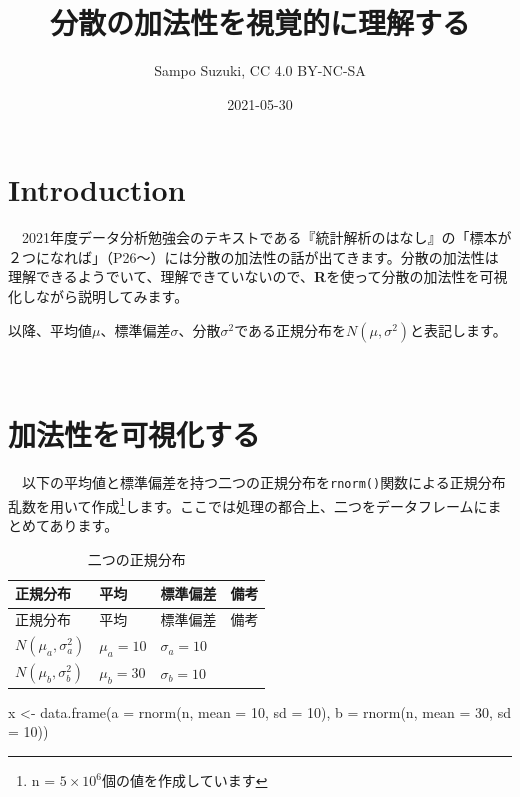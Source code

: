 \documentclass[]{tufte-handout}
\title[分散の加法性を視覚的に理解する]{分散の加法性を視覚的に理解する}
\author{Sampo Suzuki, CC 4.0 BY-NC-SA}
\date{2021-05-30}
\newenvironment{Shaded}{}{}
\newcommand{\AttributeTok}[1]{\textcolor[rgb]{0.49,0.56,0.16}{#1}}
\newcommand{\DecValTok}[1]{\textcolor[rgb]{0.25,0.63,0.44}{#1}}
\newcommand{\FunctionTok}[1]{\textcolor[rgb]{0.02,0.16,0.49}{#1}}
\newcommand{\NormalTok}[1]{#1}
\newcommand{\OtherTok}[1]{\textcolor[rgb]{0.00,0.44,0.13}{#1}}
\begin{document}
\maketitle




\hypertarget{introduction}{%
\section{\texorpdfstring{\textbf{Introduction}}{Introduction}}\label{introduction}}

　2021年度データ分析勉強会のテキストである『統計解析のはなし』\citep{ToukeiKaisekinoHanashi}の「標本が２つになれば」（P26〜）には分散の加法性の話が出てきます。分散の加法性は理解できるようでいて、理解できていないので、\textbf{R}を使って分散の加法性を可視化しながら説明してみます。

以降、平均値\(\mu\)、標準偏差\(\sigma\)、分散\(\sigma^2\)である正規分布を\(N(\mu, \sigma^2)\)と表記します。

　

\hypertarget{ux52a0ux6cd5ux6027ux3092ux53efux8996ux5316ux3059ux308b}{%
\section{\texorpdfstring{\textbf{加法性を可視化する}}{加法性を可視化する}}\label{ux52a0ux6cd5ux6027ux3092ux53efux8996ux5316ux3059ux308b}}

　以下の平均値と標準偏差を持つ二つの正規分布を\texttt{rnorm()}関数による正規分布乱数を用いて作成\footnote{n
  = \ensuremath{5\times 10^{6}}個の値を作成しています}します。ここでは処理の都合上、二つをデータフレームにまとめてあります。

\begin{longtable}[]{@{}llll@{}}
\caption{二つの正規分布}\tabularnewline
\toprule
正規分布 & 平均 & 標準偏差 & 備考 \\
\midrule
\endfirsthead
\toprule
正規分布 & 平均 & 標準偏差 & 備考 \\
\midrule
\endhead
\(N(\mu_a, \sigma^2_a)\) & \(\mu_a = 10\) & \(\sigma_a = 10\) & \\
\(N(\mu_b, \sigma^2_b)\) & \(\mu_b = 30\) & \(\sigma_b = 10\) & \\
\bottomrule
\end{longtable}

\begin{Shaded}
\begin{Highlighting}[numbers=left,,]
\NormalTok{x }\OtherTok{\textless{}{-}} \FunctionTok{data.frame}\NormalTok{(}\AttributeTok{a =} \FunctionTok{rnorm}\NormalTok{(n, }\AttributeTok{mean =} \DecValTok{10}\NormalTok{, }\AttributeTok{sd =} \DecValTok{10}\NormalTok{),}
                \AttributeTok{b =} \FunctionTok{rnorm}\NormalTok{(n, }\AttributeTok{mean =} \DecValTok{30}\NormalTok{, }\AttributeTok{sd =} \DecValTok{10}\NormalTok{))}
\end{Highlighting}
\end{Shaded}
\end{document}

